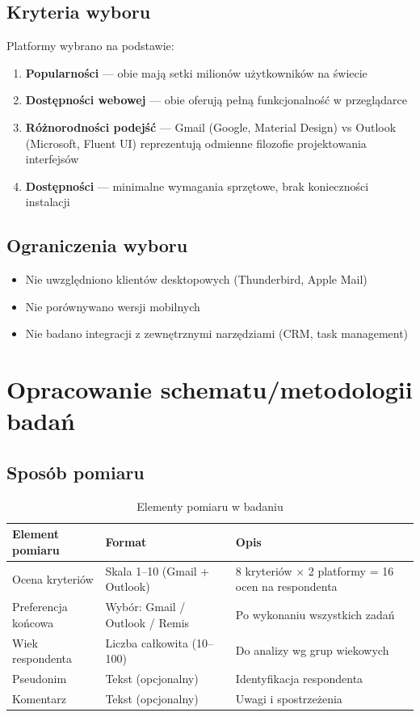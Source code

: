 \documentclass[12pt,a4paper]{article}
\begin{document}
\subsection{Kryteria wyboru}

Platformy wybrano na podstawie:
\begin{enumerate}[noitemsep]
    \item \textbf{Popularności} --- obie mają setki milionów użytkowników na świecie
    \item \textbf{Dostępności webowej} --- obie oferują pełną funkcjonalność w przeglądarce
    \item \textbf{Różnorodności podejść} --- Gmail (Google, Material Design) vs Outlook (Microsoft, Fluent UI) reprezentują odmienne filozofie projektowania interfejsów
    \item \textbf{Dostępności} --- minimalne wymagania sprzętowe, brak konieczności instalacji
\end{enumerate}

\subsection{Ograniczenia wyboru}

\begin{itemize}[noitemsep]
    \item Nie uwzględniono klientów desktopowych (Thunderbird, Apple Mail)
    \item Nie porównywano wersji mobilnych
    \item Nie badano integracji z zewnętrznymi narzędziami (CRM, task management)
\end{itemize}

\newpage
\section{Opracowanie schematu/metodologii badań}

\subsection{Sposób pomiaru}

\begin{table}[H]
\centering
\caption{Elementy pomiaru w badaniu}
\label{tab:pomiar}
\begin{tabularx}{\textwidth}{|X|X|X|}
\hline
\textbf{Element pomiaru} & \textbf{Format} & \textbf{Opis} \\
\hline
Ocena kryteriów & Skala 1--10 (Gmail + Outlook) & 8 kryteriów $\times$ 2 platformy = 16 ocen na respondenta \\
\hline
Preferencja końcowa & Wybór: Gmail / Outlook / Remis & Po wykonaniu wszystkich zadań \\
\hline
Wiek respondenta & Liczba całkowita (10--100) & Do analizy wg grup wiekowych \\
\hline
Pseudonim & Tekst (opcjonalny) & Identyfikacja respondenta \\
\hline
Komentarz & Tekst (opcjonalny) & Uwagi i spostrzeżenia \\
\hline
\end{tabularx}
\end{table}
\end{document}
